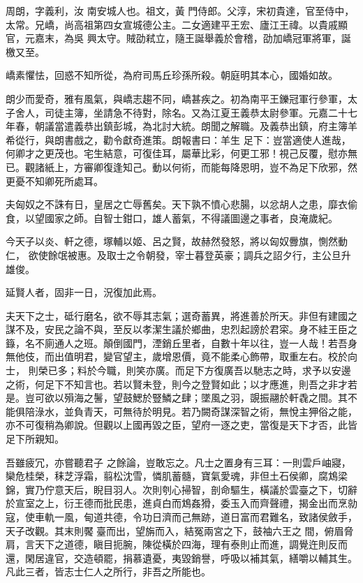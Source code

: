 
\begin{pinyinscope}

 周朗，字義利，汝
 南安城人也。祖文，黃
 門侍郎。父淳，宋初貴達，官至侍中，太常。兄嶠，尚高祖第四女宣城德公主。二女適建平王宏、廬江王禕。以貴戚顯官，元嘉末，為吳
 興太守。賊劭弒立，隨王誕舉義於會稽，劭加嶠冠軍將軍，誕檄又至。



 嶠素懼怯，回惑不知所從，為府司馬丘珍孫所殺。朝庭明其本心，國婚如故。



 朗少而愛奇，雅有風氣，與嶠志趨不同，嶠甚疾之。初為南平王鑠冠軍行參軍，太子舍人，司徒主簿，坐請急不待對，除名。又為江夏王義恭太尉參軍。元嘉二十七年春，朝議當遣義恭出鎮彭城，為北討大統。朗聞之解職。及義恭出鎮，府主簿羊希從行，與朗書戲之，勸令獻奇進策。朗報書曰：羊生
 足下：豈當適使人進哉，何卿才之更茂也。宅生結意，可復佳耳，屬華比彩，何更工邪！視己反覆，慰亦無已。觀諸紙上，方審卿復逢知己。動以何術，而能每降恩明，豈不為足下欣邪，然更憂不知卿死所處耳。



 夫匈奴之不誅有日，皇居之亡辱舊矣。天下孰不憤心悲腸，以忿胡人之患，靡衣偷食，以望國家之師。自智士鉗口，雄人蓄氣，不得議圖邊之事者，良淹歲紀。



 今天子以炎、軒之德，塚輔以姬、呂之賢，故赫然發怒，將以匈奴釁旗，惻然動仁，
 欲使餘氓被惠。及取士之令朝發，宰士暮登英豪；調兵之詔夕行，主公旦升雄俊。



 延賢人者，固非一日，況復加此焉。



 夫天下之士，砥行磨名，欲不辱其志氣；選奇蓄異，將進善於所天。非但有建國之謀不及，安民之論不與，至反以孝潔生議於鄉曲，忠烈起謗於君寀。身不絓王臣之籙，名不廁通人之班。顛倒國門，湮銷丘里者，自數十年以往，豈一人哉！若吾身無他伎，而出值明君，變官望主，歲增恩價，竟不能柔心飾帶，取重左右。校於向士，
 則榮已多；料於今職，則笑亦廣。而足下方復廣吾以馳志之時，求予以安邊之術，何足下不知言也。若以賢未登，則今之登賢如此；以才應進，則吾之非才若是。豈可欲以殞海之鬐，望鼓鰓於豎鱗之肆；墜風之羽，覬振翮於軒毳之間。其不能俱陪淥水，並負青天，可無待於明見。若乃闕奇謀深智之術，無悅主狎俗之能，亦不可復稍為卿說。但觀以上國再毀之臣，望府一逐之吏，當復是天下才否，此皆足下所親知。



 吾雖疲冗，亦嘗聽君子
 之餘論，豈敢忘之。凡士之置身有三耳：一則雲戶岫寢，欒危桂榮，秣芝浮霜，翦松沈雪，憐肌蓄髓，寶氣愛魂，非但土石侯卿，腐鴆梁錦，實乃佇意天后，睨目羽人。次則刳心掃智，剖命驅生，橫議於雲臺之下，切辭於宣室之上，衍王德而批民患，進貞白而鴆姦猾，委玉入而齊聲禮，揭金出而烹勍寇，使車軌一風，甸道共德，令功日濟而己無跡，道日富而君難名，致諸侯斂手，天子改觀。其末則饜臺而出，望旃而入，結冤兩宮之下，鼓袖六王之
 間，俯眉脅肩，言天下之道德，瞋目扼腕，陳從橫於四海，理有泰則止而進，調覺迕則反而還，閑居違官，交造頓罷，捐慕遺憂，夷毀銷譽，呼吸以補其氣，繕嚼以輔其生。凡此三者，皆志士仁人之所行，非吾之所能也。




\end{pinyinscope}
